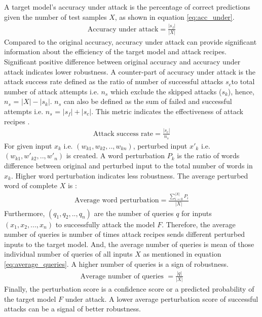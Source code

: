 \documentclass[%
	BCOR=8mm, %
	DIV=12,
	toc=bibliography, %
	toc=listof, %
	oneside, %
	egregdoesnotlikesansseriftitles, %
	]{scrbook}
\begin{document}
A target model's accuracy under attack is the percentage of correct predictions given the number of test samples $X$, as shown in equation \ref{eq:acc_under}. 
 \begin{equation}
    \begin{aligned}
        \mbox{Accuracy under attack}=\frac{|s_{f}|}{|X|}
        \label{eq:acc_under}
    \end{aligned}
\end{equation}
Compared to the original accuracy, accuracy under attack can provide significant information about the efficiency of the target model and attack recipes. Significant positive difference between original accuracy and accuracy under attack  indicates lower robustness. A counter-part of accuracy under attack is the attack success rate defined as the ratio of number of successful attacks $s_{c}$to total number of attack attempts i.e. $n_{s}$ which exclude the skipped attacks ($s_{k}$), hence,  $n_{s}$ = ${|X|-|s_{k}|}$. $n_{s}$ can also be defined as the sum of failed and successful attempts i.e. $n_{s}$ = ${|s_{f}|+|s_{c}|}$. This metric  indicates the effectiveness of attack recipes .\\
 \begin{equation}
    \begin{aligned}
        \mbox{Attack success rate}=\frac{|s_{c}|}{n_{s}}
        \label{eq:attack_success_rate}
    \end{aligned}
\end{equation}
For given input $x_{k}$ i.e. $(w_{k1},w_{k2},..,w_{kn})$, perturbed input $x'_{k}$ i.e. $(w_{k1},w'_{k2},..,w'_{n})$ is created. A word perturbation $P_{k}$ is the ratio of words difference between original and perturbed input to the total number of words in $x_{k}$. Higher word perturbation indicates less robustness. The average perturbed word of complete $X$ is :
 \begin{equation}
    \begin{aligned}
        \mbox{Average word perturbation}= \frac{\sum_{i=0}^{|X|} P_{i}} {|X|}
        \label{eq:attack_success_rate}
    \end{aligned}
\end{equation}
 Furthermore,  $(q_{1},q_{2},..,q_{n})$ are the number of queries $q$ for inputs $(x_{1},x_{2},...,x_{n})$ to successfully attack the model $F$. Therefore, the average number of queries is number of times attack recipes sends different perturbed inputs to the target model. And, the average number of queries is mean of those individual number of queries of all inputs $X$ as mentioned in equation \ref{eq:average_queries}. A higher number of queries is a sign of robustness.\\
  \begin{equation}
     \begin{aligned}
         \mbox{Average number of queries }= \frac{|q|} {|X|}
         \label{eq:average_queries}
     \end{aligned}
 \end{equation}
Finally, the perturbation score is a confidence score or a predicted probability of the target model $F$ under attack. A lower average perturbation score of successful attacks can be a signal of better robustness. 
\end{document}
